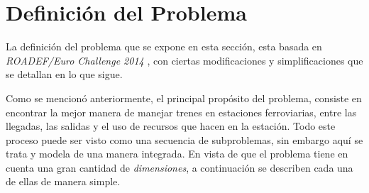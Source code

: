 \documentclass[letter, 10pt]{article}
\begin{document}
\section{Definición del Problema} \label{probdef}
La definición del problema que se expone en esta sección, esta basada en \textit{ROADEF/Euro Challenge 2014} 
\cite{Problem}, con ciertas modificaciones y simplificaciones que se detallan en lo que sigue.


Como se mencionó anteriormente, el principal propósito del problema, consiste en encontrar la mejor
manera de manejar trenes en estaciones ferroviarias, entre las llegadas, las salidas y el uso de recursos
que hacen en la estación. Todo este proceso puede ser visto como una secuencia de subproblemas, sin embargo
aquí se trata y modela de una manera integrada. En vista de que el problema tiene en cuenta una gran 
cantidad de \textit{dimensiones}, a continuación se describen cada una de ellas de manera simple.
\end{document}
